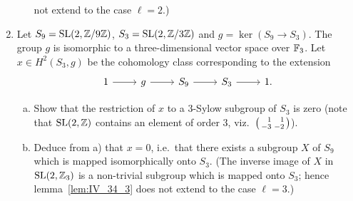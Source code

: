 \begin{enumerate}
\begin{enumerate}[a)]
		not extend to the case $\ell = 2$.)
\end{enumerate}
\item Let $S_9 = \operatorname{SL}(2, \mathbb{Z}/9\mathbb{Z})$, $S_3 = \operatorname{SL}(2, \mathbb{Z}/3\mathbb{Z})$ and $g = \ker(S_9 \to
	S_3)$. The group $g$ is isomorphic to a three-dimensional vector space
	over $\mathbb{F}_3$. Let $x \in H^2(S_3, g)$ be the cohomology class
	corresponding to the extension
	\[\begin{tikzcd}
		1 \rar & g \rar & S_9 \rar & S_3 \rar & 1.
	\end{tikzcd}\]
\begin{enumerate}[a)]
	\item Show that the restriction of $x$ to a 3-Sylow subgroup of $S_3$
		is zero (note that $\operatorname{SL}(2, \mathbb{Z})$ contains an element of order 3,
		viz.\ 
		$\begin{psmallmatrix}
			\phantom{-}1 & \phantom{-}1 \\
			-3 & -2
		\end{psmallmatrix}$).
	\item Deduce from a) that $x = 0$, i.e.\ that there exists a subgroup
		$X$ of $S_9$ which is mapped isomorphically onto $S_3$.
		(The inverse image of $X$ in $\operatorname{SL}(2, \mathbb{Z}_3)$ is a non-trivial
		subgroup which is mapped onto $S_3$; hence
		lemma~\ref{lem:IV_34_3} does not extend to
		the case $\ell = 3$.)
\end{enumerate}
\end{enumerate}

